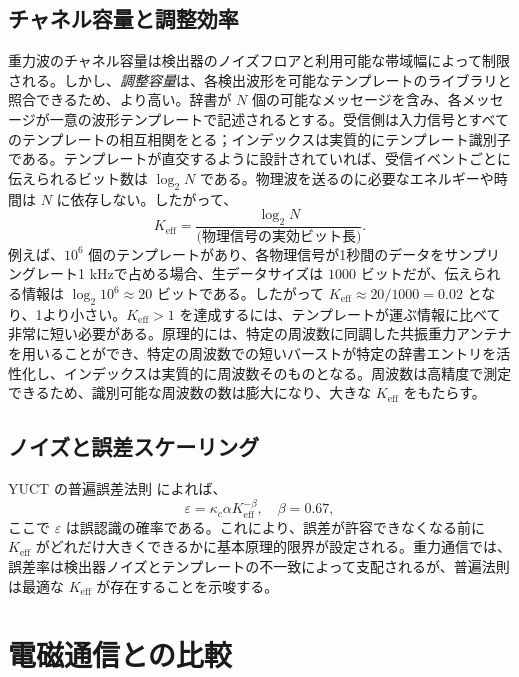 \documentclass[12pt,a4paper]{article}
\newcommand{\Keff}{K_{\mathrm{eff}}}
\newcommand{\kappac}{\kappa_c}
\newcommand{\eps}{\varepsilon}
\begin{document}
	\subsection{チャネル容量と調整効率}
	
	重力波のチャネル容量は検出器のノイズフロアと利用可能な帯域幅によって制限される。しかし、\emph{調整容量}は、各検出波形を可能なテンプレートのライブラリと照合できるため、より高い。辞書が \(N\) 個の可能なメッセージを含み、各メッセージが一意の波形テンプレートで記述されるとする。受信側は入力信号とすべてのテンプレートの相互相関をとる；インデックスは実質的にテンプレート識別子である。テンプレートが直交するように設計されていれば、受信イベントごとに伝えられるビット数は \(\log_2 N\) である。物理波を送るのに必要なエネルギーや時間は \(N\) に依存しない。したがって、
	\begin{equation}
		\Keff = \frac{\log_2 N}{\text{(物理信号の実効ビット長)}}.
	\end{equation}
	例えば、\(10^6\) 個のテンプレートがあり、各物理信号が1秒間のデータをサンプリングレート1 kHzで占める場合、生データサイズは \(1000\) ビットだが、伝えられる情報は \(\log_2 10^6 \approx 20\) ビットである。したがって \(\Keff \approx 20/1000 = 0.02\) となり、1より小さい。\(\Keff > 1\) を達成するには、テンプレートが運ぶ情報に比べて非常に短い必要がある。原理的には、特定の周波数に同調した共振重力アンテナを用いることができ、特定の周波数での短いバーストが特定の辞書エントリを活性化し、インデックスは実質的に周波数そのものとなる。周波数は高精度で測定できるため、識別可能な周波数の数は膨大になり、大きな \(\Keff\) をもたらす。
	
	\subsection{ノイズと誤差スケーリング}
	
	YUCT の普遍誤差法則 \cite{AppendixL} によれば、
	\begin{equation}
		\eps = \kappac \alpha \Keff^{-\beta}, \quad \beta = 0.67,
		\label{eq:universal-scaling}
	\end{equation}
	ここで \(\eps\) は誤認識の確率である。これにより、誤差が許容できなくなる前に \(\Keff\) がどれだけ大きくできるかに基本原理的限界が設定される。重力通信では、誤差率は検出器ノイズとテンプレートの不一致によって支配されるが、普遍法則は最適な \(\Keff\) が存在することを示唆する。
	
	\section{電磁通信との比較}
	\label{sec:comparison}
	
\end{document}
